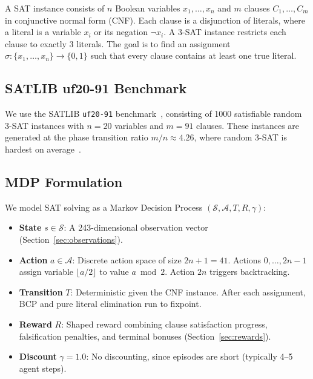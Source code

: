 \documentclass{article}
\begin{document}
A SAT instance consists of $n$ Boolean variables $x_1, \ldots, x_n$ and $m$ clauses $C_1, \ldots, C_m$ in conjunctive normal form (CNF). Each clause is a disjunction of literals, where a literal is a variable $x_i$ or its negation $\neg x_i$. A 3-SAT instance restricts each clause to exactly 3 literals. The goal is to find an assignment $\sigma: \{x_1, \ldots, x_n\} \to \{0, 1\}$ such that every clause contains at least one true literal.

\subsection{SATLIB uf20-91 Benchmark}

We use the SATLIB \texttt{uf20-91} benchmark~\cite{hoos2000satlib}, consisting of 1000 satisfiable random 3-SAT instances with $n = 20$ variables and $m = 91$ clauses. These instances are generated at the phase transition ratio $m/n \approx 4.26$, where random 3-SAT is hardest on average~\cite{crawford1996experimental}.

\subsection{MDP Formulation}

We model SAT solving as a Markov Decision Process $(\mathcal{S}, \mathcal{A}, T, R, \gamma)$:

\begin{itemize}
    \item \textbf{State} $s \in \mathcal{S}$: A 243-dimensional observation vector (Section~\ref{sec:observations}).
    \item \textbf{Action} $a \in \mathcal{A}$: Discrete action space of size $2n + 1 = 41$. Actions $0, \ldots, 2n-1$ assign variable $\lfloor a/2 \rfloor$ to value $a \bmod 2$. Action $2n$ triggers backtracking.
    \item \textbf{Transition} $T$: Deterministic given the CNF instance. After each assignment, BCP and pure literal elimination run to fixpoint.
    \item \textbf{Reward} $R$: Shaped reward combining clause satisfaction progress, falsification penalties, and terminal bonuses (Section~\ref{sec:rewards}).
    \item \textbf{Discount} $\gamma = 1.0$: No discounting, since episodes are short (typically 4--5 agent steps).
\end{itemize}

\end{document}

